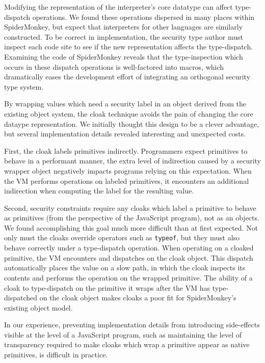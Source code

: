 \documentclass[11pt,onecolumn]{article}
\newcommand{\code}[1]{\texttt{#1}}
\begin{document}
Modifying the representation of the interpreter's core datatype can affect type-dispatch operations.
We found these operations dispersed in many places within SpiderMonkey, but expect that interpreters for other languages are similarly constructed.
To be correct in implementation, the security type author must inspect each code site to see if the new representation affects the type-dispatch.
Examining the code of SpiderMonkey reveals that the type-inspection which occurs in these dispatch operations is well-factored into macros, which dramatically eases the development effort of integrating an orthogonal security type system.

By wrapping values which need a security label in an object derived from the existing object system, the cloak technique avoids the pain of changing the core dataype representation.
We initially thought this design to be a clever advantage, but several implementation details revealed interesting and unexpected costs.

First, the cloak labels primitives indirectly.
Programmers expect primitives to behave in a performant manner, the extra level of indirection caused by a security wrapper object negatively impacts programs relying on this expectation.
When the VM performs operations on labeled primitives, it encounters an additional indirection when computing the label for the resulting value.

Second, security constraints require any cloaks which label a primitive to behave as primitives (from the perspective of the JavaScript program), not as an objects.
We found accomplishing this goal much more difficult than at first expected.
Not only must the cloaks override operators such as \code{typeof}, but they must also behave correctly under a type-dispatch operation.
When operating on a cloaked primitive, the VM encounters and dispatches on the cloak object.
This dispatch automatically places the value on a slow path, in which the cloak inspects its contents and performs the operation on the wrapped primitive.
The ability of a cloak to type-dispatch on the primitive it wraps after the VM has type-dispatched on the cloak object makes cloaks a poor fit for SpiderMonkey's existing object model.

In our experience, preventing implementation details from introducing side-effects visible at the level of a JavaScript program, such as maintaining the level of transparency required to make cloaks which wrap a primitive appear as native primitives, is difficult in practice.
\end{document}
